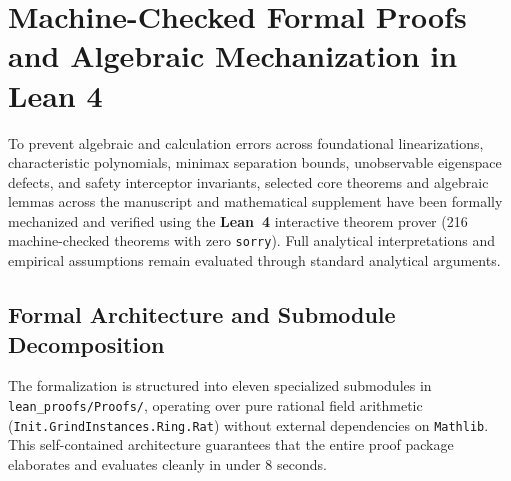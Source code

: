 \documentclass[10pt,twocolumn,letterpaper]{article}
\theoremstyle{definition}
\theoremstyle{remark}
\begin{document}
\bigskip
\section{Machine-Checked Formal Proofs and Algebraic Mechanization in Lean 4}
\label{app:lean4}

To prevent algebraic and calculation errors across foundational linearizations, characteristic polynomials, minimax separation bounds, unobservable eigenspace defects, and safety interceptor invariants, selected core theorems and algebraic lemmas across the manuscript and mathematical supplement have been formally mechanized and verified using the \textbf{Lean~4} interactive theorem prover (216 machine-checked theorems with zero \texttt{sorry}). Full analytical interpretations and empirical assumptions remain evaluated through standard analytical arguments.

\subsection{Formal Architecture and Submodule Decomposition}
The formalization is structured into eleven specialized submodules in \texttt{lean\_proofs/Proofs/}, operating over pure rational field arithmetic (\texttt{Init.GrindInstances.Ring.Rat}) without external dependencies on \texttt{Mathlib}. This self-contained architecture guarantees that the entire proof package elaborates and evaluates cleanly in under 8 seconds.
\end{document}
